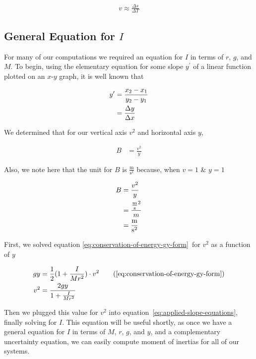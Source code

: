 \documentclass[coverpage]{article}
\newcommand{\mpssq}{\frac{\text{m}}{\text{s}^2}}
\begin{document}
	\begin{align}
		v \approx \frac{\Delta{s}}{\Delta{T}} \label{eq:delta-s-delta-t}
	\end{align}

	\subsection{General Equation for $I$}
	
	For many of our computations we required an equation for $I$ in terms of $r$, $g$, and $M$. To begin, using the elementary equation for some slope $y^\prime$ of a linear function plotted on an $x$-$y$ graph, it is well known that
	
	\begin{align}
		y^\prime &= \frac{x_2 - x_1}{y_2 - y_1} \notag \\
		&= \frac{\Delta{y}}{\Delta{x}}
	\end{align}
	
	We determined that for our vertical axis $v^2$ and horizontal axis $y$,
	
	\begin{align}
		B &= \frac{v^2}{y} \label{eq:applied-slope-equations}
	\end{align}
	
	Also, we note here that the unit for $B$ is $\mpssq$ because, when $v=1$ \& $y=1$
	
	\begin{align}
		B &= \frac{v^2}{y} \notag \\
		&= \frac{\frac{\text{m}}{\text{s}}^2}{m} \notag \\
		&= \mpssq
	\end{align}
	
	First, we solved equation \ref{eq:conservation-of-energy-gy-form}~for $v^2$ as a function of $y$
	
	\begin{align}
		gy &= \frac{1}{2}(1 + \frac{I}{Mr^2}) \cdot v^2 \tag{\ref{eq:conservation-of-energy-gy-form}} \\
		v^2 &= \frac{2gy}{1 + \frac{I}{Mr^2}}
	\end{align}
	
	Then we plugged this value for $v^2$ into equation~\ref{eq:applied-slope-equations}, finally solving for $I$. This equation will be useful shortly, as once we have a general equation for $I$ in terms of $M$, $r$, $g$, and $y$, and a complementary uncertainty equation, we can easily compute moment of inertias for all of our systems.
	
\end{document}
